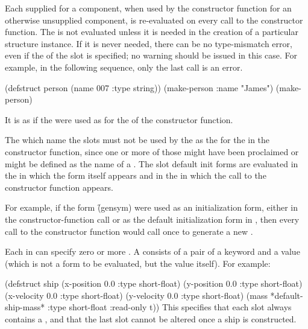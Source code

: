 Each  supplied for a  component,
when used by the constructor function for an otherwise unsupplied
component, is re-evaluated on every call to the
constructor function.  
The  is not evaluated 
        unless it is needed in the creation of a particular structure
        instance.  If it is never needed, there can be no type-mismatch
        error, even if the  
of the slot is specified; no warning
        should be issued in this case.
For example, in the following sequence, only the last call is an error.
 
\code
 (defstruct person (name 007 :type string)) 
 (make-person :name "James")
 (make-person)
\endcode
 
It is as if the  were 
used as  for the  
of the constructor function.
 
The  which name the slots must not be used by the 
 as the  for the 
in the constructor function, since one or more of those 
might have been proclaimed  or might be defined as
the name of a .
The slot default init forms are evaluated 
in the  in which the  form itself appears and
in the  in which the call to the constructor function appears.

For example, if the form \f{(gensym)} were used as an initialization form,
either in the constructor-function call or as the default initialization form
in , then every call to the constructor function would call
 once to generate a new .

Each  in  can specify zero or more
.  
A  consists of a pair of a keyword and a value
(which is not a form to be evaluated, but the value itself).  For example:

\code
 (defstruct ship
   (x-position 0.0 :type short-float)
   (y-position 0.0 :type short-float)
   (x-velocity 0.0 :type short-float)
   (y-velocity 0.0 :type short-float)
   (mass *default-ship-mass* :type short-float :read-only t))
\endcode
This specifies that each slot always contains a ,
and that the last slot cannot be altered once a ship is constructed.

